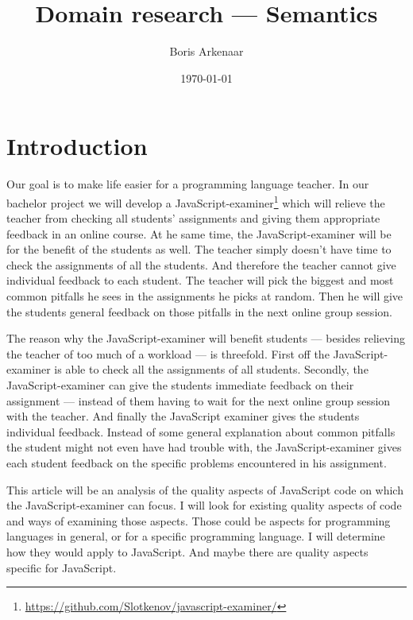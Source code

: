 \documentclass{article}
\begin{document}
 

\title{Domain research --- Semantics}
\author{Boris Arkenaar}
\date{\today}
\maketitle 


\section{Introduction} 

Our goal is to make life easier for a programming language teacher. In our
bachelor project we will develop a
JavaScript-examiner\footnote{\url{https://github.com/Slotkenov/javascript-examiner/}}
which will relieve the teacher from checking all students' assignments and
giving them appropriate feedback in an online course. At he same time, the
JavaScript-examiner will be for the benefit of the students as well. The
teacher simply doesn't have time to check the assignments of all the
students. And therefore the teacher cannot give individual feedback to each
student. The teacher will pick the biggest and most common pitfalls he sees in
the assignments he picks at random. Then he will give the students general
feedback on those pitfalls in the next online group session.

The reason why the JavaScript-examiner will benefit students --- besides
relieving the teacher of too much of a workload --- is threefold.  First off
the JavaScript-examiner is able to check all the assignments of all
students. Secondly, the JavaScript-examiner can give the students immediate
feedback on their assignment --- instead of them having to wait for the next
online group session with the teacher. And finally the JavaScript examiner
gives the students individual feedback. Instead of some general explanation
about common pitfalls the student might not even have had trouble with, the
JavaScript-examiner gives each student feedback on the specific problems
encountered in his assignment.

This article will be an analysis of the quality aspects of JavaScript code on
which the JavaScript-examiner can focus. I will look for existing quality
aspects of code and ways of examining those aspects. Those could be aspects for
programming languages in general, or for a specific programming language. I
will determine how they would apply to JavaScript. And maybe there are quality
aspects specific for JavaScript.
\end{document}
